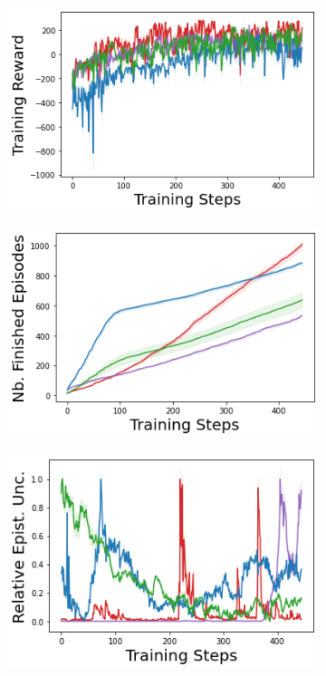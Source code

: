 \begin{figure}
    \begin{subfigure}{.24\textwidth}
        \includegraphics[width=\textwidth]{sections/011_icml2022/resources/lunarlander-training_total_reward-training-model.png}
    \end{subfigure}
    \begin{subfigure}{.24\textwidth}
        \includegraphics[width=\textwidth]{sections/011_icml2022/resources/lunarlander-n_finished_training_episodes-training-model.png}  
    \end{subfigure}
    \begin{subfigure}{.24\textwidth}
        \includegraphics[width=\textwidth]{sections/011_icml2022/resources/lunarlander-training_epistemic_uncertainty-training-model.png}

\end{subfigure}
\end{figure}
